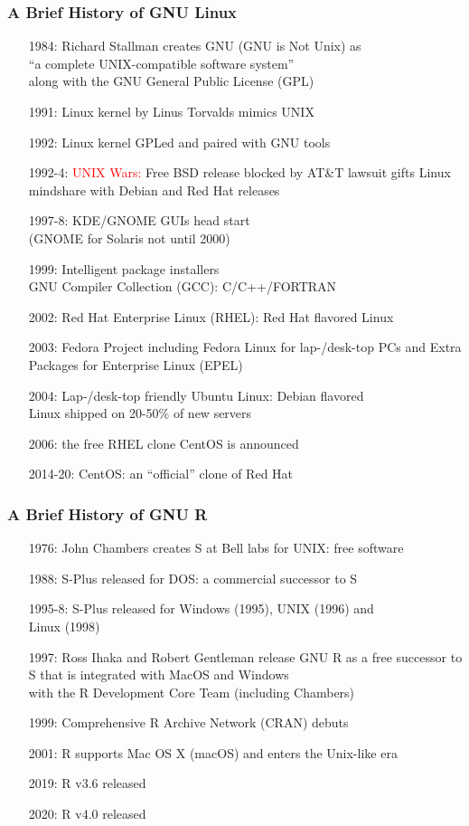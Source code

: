 \documentclass[11pt,pdftex,dvipsnames,usenames,helvetica]{beamer}
\begin{document}
\begin{frame}
\frametitle{A Brief History of GNU Linux}

\begin{itemize}
\item[1984:] Richard Stallman creates GNU (GNU is Not Unix) as\\ 
``a complete UNIX-compatible software system'' \\
along with the GNU General Public License (GPL) 
\item[1991:] Linux kernel by Linus Torvalds mimics UNIX 
\item[1992:] Linux kernel GPLed and paired with GNU tools 
\item[1992-4:] \textcolor{red}{UNIX Wars:} Free BSD release blocked by AT\&T lawsuit gifts Linux mindshare with Debian and Red Hat releases 
\item[1997-8:] KDE/GNOME GUIs head start\\ (GNOME for Solaris not until 2000)
\item[1999:] Intelligent package installers \\ GNU Compiler Collection (GCC): C/C++/FORTRAN 
\item[2002:] Red Hat Enterprise Linux (RHEL): Red Hat flavored Linux
\item[2003:] Fedora Project including Fedora Linux for lap-/desk-top PCs and
 Extra Packages for Enterprise Linux (EPEL)
\item[2004:] Lap-/desk-top friendly Ubuntu Linux: Debian flavored \\ 
Linux shipped on 20-50\% of new servers 
\item[2006:] the free RHEL clone CentOS is announced
\item[2014-20:] CentOS: an ``official'' clone of Red Hat
\end{itemize}
\end{frame}

\begin{frame}
\frametitle{A Brief History of GNU R}

\begin{itemize}
\item[1976:] John Chambers creates S at Bell labs for UNIX: free software
\item[1988:] S-Plus released for DOS: a commercial successor to S
\item[1995-8:] S-Plus released for Windows (1995), UNIX (1996) and\\
 Linux (1998)
\item[1997:] Ross Ihaka and Robert Gentleman release GNU R as a free
successor to S that is integrated with MacOS and Windows\\
with the R Development Core Team (including Chambers)
\item[1999:] Comprehensive R Archive Network (CRAN) debuts
\item[2001:] R supports Mac OS X (macOS) and enters the Unix-like era
\item[2019:] R v3.6 released
\item[2020:] R v4.0 released
\end{itemize}

\end{frame}
\end{document}
